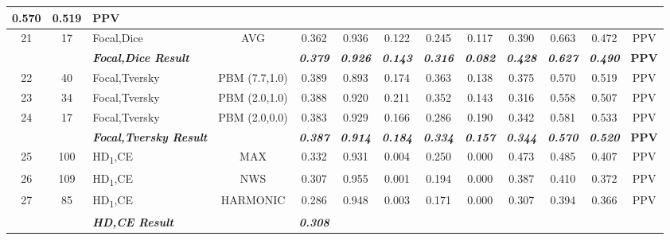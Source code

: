 \begin{table}[H]
{\begin{tabular}{cc|l|c|c|c|c|c|c|c|c|c|c|}
    0.570 &
    0.519 &
    PPV \\ \hline
  \multicolumn{1}{|c|}{21} &
    17 &
    Focal,Dice &
    AVG &
    0.362 &
    0.936 &
    0.122 &
    0.245 &
    0.117 &
    0.390 &
    0.663 &
    0.472 &
    PPV \\ \hline
  \textbf{} &
    \textit{\textbf{}} &
    \textit{\textbf{Focal,Dice Result}} &
    \textbf{} &
    \textit{\textbf{0.379}} &
    \textit{\textbf{0.926}} &
    \textit{\textbf{0.143}} &
    \textit{\textbf{0.316}} &
    \textit{\textbf{0.082}} &
    \textit{\textbf{0.428}} &
    \textit{\textbf{0.627}} &
    \textit{\textbf{0.490}} &
    \textbf{PPV} \\ \hline
  \multicolumn{1}{|c|}{22} &
    40 &
    Focal,Tversky &
    PBM (7.7,1.0) &
    0.389 &
    0.893 &
    0.174 &
    0.363 &
    0.138 &
    0.375 &
    0.570 &
    0.519 &
    PPV \\ \hline
  \multicolumn{1}{|c|}{23} &
    34 &
    Focal,Tversky &
    PBM (2.0,1.0) &
    0.388 &
    0.920 &
    0.211 &
    0.352 &
    0.143 &
    0.316 &
    0.558 &
    0.507 &
    PPV \\ \hline
  \multicolumn{1}{|c|}{24} &
    17 &
    Focal,Tversky &
    PBM (2.0,0.0) &
    0.383 &
    0.929 &
    0.166 &
    0.286 &
    0.190 &
    0.342 &
    0.581 &
    0.533 &
    PPV \\ \hline
  \textbf{} &
    \textit{\textbf{}} &
    \textit{\textbf{Focal,Tversky Result}} &
    \textbf{} &
    \textit{\textbf{0.387}} &
    \textit{\textbf{0.914}} &
    \textit{\textbf{0.184}} &
    \textit{\textbf{0.334}} &
    \textit{\textbf{0.157}} &
    \textit{\textbf{0.344}} &
    \textit{\textbf{0.570}} &
    \textit{\textbf{0.520}} &
    \textbf{PPV} \\ \hline
  \multicolumn{1}{|c|}{25} &
    100 &
    HD\textsubscript{1},CE &
    MAX &
    0.332 &
    0.931 &
    0.004 &
    0.250 &
    0.000 &
    0.473 &
    0.485 &
    0.407 &
    PPV \\ \hline
  \multicolumn{1}{|c|}{26} &
    109 &
    HD\textsubscript{1},CE &
    NWS &
    0.307 &
    0.955 &
    0.001 &
    0.194 &
    0.000 &
    0.387 &
    0.410 &
    0.372 &
    PPV \\ \hline
  \multicolumn{1}{|c|}{27} &
    85 &
    HD\textsubscript{1},CE &
    HARMONIC &
    0.286 &
    0.948 &
    0.003 &
    0.171 &
    0.000 &
    0.307 &
    0.394 &
    0.366 &
    PPV \\ \hline
   &
    \textit{\textbf{}} &
    \textit{\textbf{HD,CE Result}} &
     &
    \textit{\textbf{0.308}} &

\end{tabular}}
\end{table}
